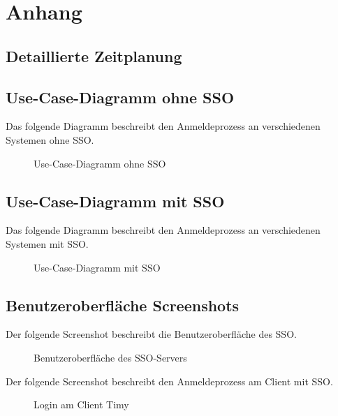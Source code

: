 \section{Anhang}
\subsection{Detaillierte Zeitplanung}
\label{app:Zeitplanung}





\clearpage

\subsection{Use-Case-Diagramm ohne SSO}
\label{app:Use-Case-Diagramm}
Das folgende Diagramm beschreibt den Anmeldeprozess an verschiedenen Systemen ohne \acs{SSO}.
\begin{figure}[htb]
\centering
{}
\caption{Use-Case-Diagramm ohne SSO}
\end{figure}
\clearpage

\subsection{Use-Case-Diagramm mit SSO}
\label{app:Use-Case-Diagramm2}
Das folgende Diagramm beschreibt den Anmeldeprozess an verschiedenen Systemen mit \acs{SSO}.
\begin{figure}[htb]
\centering
{}
\caption{Use-Case-Diagramm mit SSO}
\end{figure}
\clearpage

\subsection{Benutzeroberfläche Screenshots}
\label{app:screens}

Der folgende Screenshot beschreibt die Benutzeroberfläche des \acs{SSO}.
\begin{figure}[htb]
\centering
{}
\caption{Benutzeroberfläche des SSO-Servers}
\end{figure}

Der folgende Screenshot beschreibt  den Anmeldeprozess am Client mit \acs{SSO}.
\begin{figure}[htb]
\centering
{}
\caption{Login am Client Timy}
\end{figure}
\clearpage

